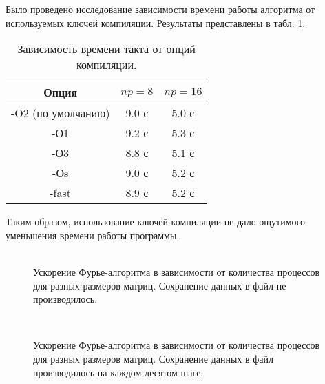 Было проведено исследование зависимости времени работы алгоритма от используемых ключей компиляции. Результаты представлены в табл. \ref{tab:compilers}.
    \begin{table}[ht]
        \centering
        \begin{tabular}{ | c | c | c | }
            \hline
            Опция		&	$np=8$	&	$np=16$ \\
            \hline
            -O2	(по умолчанию)	&	9.0 с		&	5.0 с \\
            \hline
            -О1		&	9.2 с	 	&	5.3 с \\
            \hline
            -О3		&	8.8 с		&	5.1 с \\
            \hline
            -Оs		&	9.0 с		&	5.2 с \\
            \hline
            -fast	&	8.9 с		&	5.2 с \\
            \hline
        \end{tabular}
        \begin{center}
            \caption{Зависимость времени такта от опций компиляции.}\label{tab:compilers}
        \end{center}
    \end{table}

Таким образом, использование ключей компиляции не дало ощутимого уменьшения времени работы программы.

	\begin{figure}[h!]
		\begin{center}
			\begin{minipage}{0.45\linewidth}
				 \\
                \caption{Ускорение Фурье-алгоритма в зависимости от количества процессов для разных размеров матриц. Сохранение данных в файл не производилось.}
                \label{gr:SpeedupFourierNosave}
			\end{minipage}
			\hfill
			\begin{minipage}{0.45\linewidth}
				 \\
                \caption{Ускорение Фурье-алгоритма в зависимости от количества процессов для разных размеров матриц. Сохранение данных в файл производилось на каждом десятом шаге.}
                \label{gr:SpeedupFourierSave}
			\end{minipage}
		\end{center}
	\end{figure}

